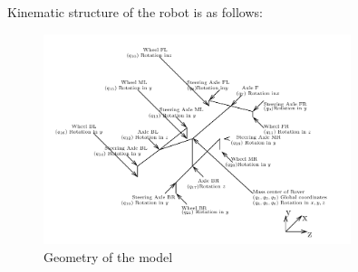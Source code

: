 \documentclass[a4paper]{article}
\begin{document}
\newpage

\noindent Kinematic structure of the robot is as follows:

\begin{figure}[h!]
  \centering
    \includegraphics[width=0.8\textwidth]{kinematics}
  \caption{Geometry of the model}
\end{figure}
  















\end{document}
